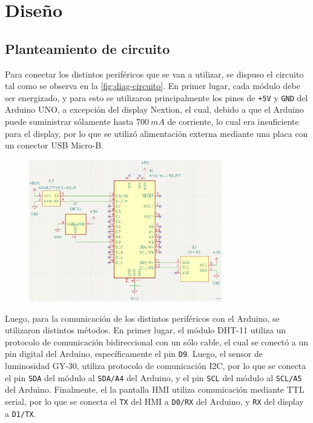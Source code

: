\section{Diseño}

\subsection{Planteamiento de circuito}

Para conectar los distintos periféricos que se van a utilizar, se dispuso el
circuito tal como se observa en la \autoref{fig:diag-circuito}. En primer
lugar, cada módulo debe ser energizado, y para esto se utilizaron
principalmente los pines de \texttt{+5V} y \texttt{GND} del Arduino UNO, a
excepción del display Nextion, el cual, debido a que el Arduino puede
suministrar sólamente hasta $700\ \unit{mA}$ de corriente, lo cual era
insuficiente para el display, por lo que se utilizó alimentación externa
mediante una placa con un conector USB Micro-B.

\begin{figure}[ht]
    \centering
    \includegraphics[width=0.75\textwidth]{Diagramas/circuito.png}
    \caption{}\label{fig:diag-circuito}
\end{figure}

Luego, para la comunicación de los distintos periféricos con el Arduino, se
utilizaron distintos métodos. En primer lugar, el módulo DHT-11 utiliza un
protocolo de comunicación bidireccional con un sólo cable, el cual se conectó a
un pin digital del Arduino, específicamente el pin \texttt{D9}. Luego, el
sensor de luminosidad GY-30, utiliza protocolo de comunicación I2C, por lo que
se conecta el pin \texttt{SDA} del módulo al \texttt{SDA/A4} del Arduino, y el
pin \texttt{SCL} del módulo al \texttt{SCL/A5} del Arduino. Finalmente, el
la pantalla HMI utiliza comunicación mediante TTL serial, por lo que se conecta
el \texttt{TX} del HMI a \texttt{D0/RX} del Arduino, y \texttt{RX} del display
a \texttt{D1/TX}.


